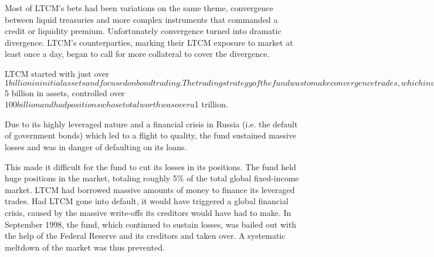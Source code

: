 Most of LTCM’s bets had been variations on the same theme, convergence between liquid treasuries and more complex instruments that commanded a credit or liquidity premium. Unfortunately convergence turned into dramatic divergence. LTCM’s counterparties, marking their LTCM exposure to market at least once a day, began to call for more collateral to cover the divergence.





LTCM started with just over $1 billion in initial assets and focused on bond trading. The trading strategy of the fund was to make convergence trades, which involve taking advantage of arbitrage between securities that are incorrectly priced relative to each other. Due to the small spread in arbitrage opportunities, the fund had to leverage itself highly to make money. At its height in 1998, the fund had $5 billion in assets, controlled over $100 billion and had positions whose total worth was over a $1 trillion. 


Due to its highly leveraged nature and a financial crisis in Russia (i.e. the default of government bonds) which led to a flight to quality, the fund sustained massive losses and was in danger of defaulting on its loans. 

This made it difficult for the fund to cut its losses in its positions. The fund held huge positions in the market, totaling roughly 5\% of the total global fixed-income market. LTCM had borrowed massive amounts of money to finance its leveraged trades. Had LTCM gone into default, it would have triggered a global financial crisis, caused by the massive write-offs its creditors would have had to make. 
In September 1998, the fund, which continued to sustain losses, was bailed out with the help of the Federal Reserve and its creditors and taken over. A systematic meltdown of the market was thus prevented.



